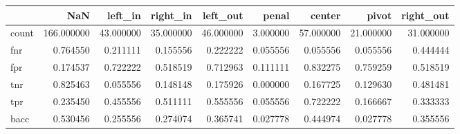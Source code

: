 \begin{tabular}{lrrrrrrrr}
\toprule
{} &         NaN &    left\_in &   right\_in &   left\_out &     penal &     center &      pivot &  right\_out \\
\midrule
count &  166.000000 &  43.000000 &  35.000000 &  46.000000 &  3.000000 &  57.000000 &  21.000000 &  31.000000 \\
fnr   &    0.764550 &   0.211111 &   0.155556 &   0.222222 &  0.055556 &   0.055556 &   0.055556 &   0.444444 \\
fpr   &    0.174537 &   0.722222 &   0.518519 &   0.712963 &  0.111111 &   0.832275 &   0.759259 &   0.518519 \\
tnr   &    0.825463 &   0.055556 &   0.148148 &   0.175926 &  0.000000 &   0.167725 &   0.129630 &   0.481481 \\
tpr   &    0.235450 &   0.455556 &   0.511111 &   0.555556 &  0.055556 &   0.722222 &   0.166667 &   0.333333 \\
bacc  &    0.530456 &   0.255556 &   0.274074 &   0.365741 &  0.027778 &   0.444974 &   0.027778 &   0.355556 \\
\bottomrule
\end{tabular}
